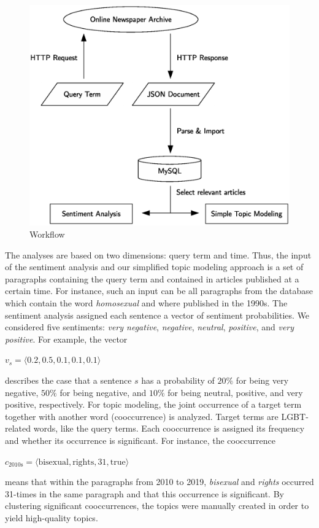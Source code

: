\documentclass[10pt,a4paper,twocolumn]{scrartcl}
\begin{document}
\begin{figure}
\includegraphics[width=\columnwidth]{figures/workflow_eps}
\caption{Workflow} \label{fig:workflow}
\end{figure}

The analyses are based on two dimensions: query term and time. Thus, the input of the sentiment analysis and our simplified topic modeling approach is a set of paragraphs containing the query term and contained in articles published at a certain time. For instance, such an input can be all paragraphs from the database which contain the word \textit{homosexual} and where published in the 1990s. The sentiment analysis assigned each sentence a vector of sentiment probabilities. We considered five sentiments: \textit{very negative}, \textit{negative}, \textit{neutral}, \textit{positive}, and \textit{very positive}. For example, the vector \begin{center}
$v_s = \langle 0.2, 0.5, 0.1, 0.1, 0.1\rangle$
\end{center} describes the case that a sentence $s$ has a probability of $20\%$ for being very negative, $50\%$ for being negative, and $10\%$ for being neutral, positive, and very positive, respectively. For topic modeling, the joint occurrence of a target term together with another word (cooccurrence) is analyzed. Target terms are LGBT-related words, like the query terms. Each cooccurrence is assigned its frequency and whether its occurrence is significant. For instance, the cooccurrence \begin{center}
$c_\text{2010s} = \langle \text{bisexual}, \text{rights}, 31, \text{true}\rangle$
\end{center} means that within the paragraphs from 2010 to 2019, \textit{bisexual} and \textit{rights} occurred 31-times in the same paragraph and that this occurrence is significant. By clustering significant cooccurrences, the topics were manually created in order to yield high-quality topics.
\end{document}
